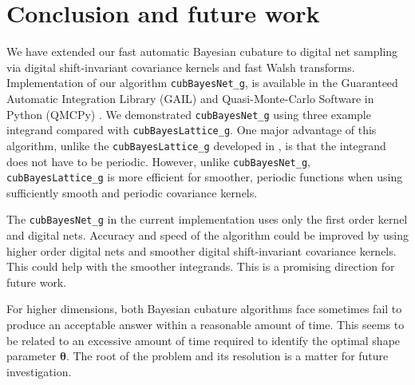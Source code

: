 \documentclass[graybox,footinfo]{svmult}
\newcommand{\FJHNote}[1]{{\textcolor{blue}{FJH: #1}}}
\begin{document}







\section{Conclusion and future work}
\label{FJ:sec:conclusion-future-work}

We have extended our fast automatic Bayesian cubature to digital net sampling via digital shift-invariant covariance kernels and fast Walsh transforms.  Implementation of our algorithm \texttt{cubBayesNet\_g}, is available in the Guaranteed Automatic Integration Library (GAIL) \cite{ChoEtal21a} and Quasi-Monte-Carlo Software in Python (QMCPy) \cite{QMCPy2020a}.  We demonstrated \texttt{cubBayesNet\_g} using three example integrand compared with \texttt{cubBayesLattice\_g}. 
One major advantage of this algorithm, unlike the \texttt{cubBayesLattice\_g} developed in \cite{RatHic19a}, is that the integrand does not have to be periodic.  However, unlike \texttt{cubBayesNet\_g}, \texttt{cubBayesLattice\_g} is more efficient for smoother, periodic functions when using sufficiently smooth and periodic covariance kernels.

The \texttt{cubBayesNet\_g} in the current implementation uses only the first order kernel and digital nets. Accuracy and speed of the algorithm could be improved by using higher order digital nets and smoother digital shift-invariant covariance kernels. This could help with the smoother integrands. This is a promising direction for future work.

For higher dimensions, both Bayesian cubature algorithms face sometimes fail to produce an acceptable answer within a reasonable amount of time.  This seems to be related to an excessive amount of time required to identify the optimal shape parameter $\boldsymbol{\theta}$.  The root of the problem and its resolution is a matter for future investigation.




% 


\end{document}
